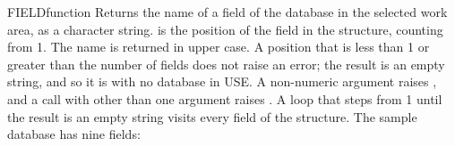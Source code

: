 \begin{XbaseEntry}{FIELD}{function}
Returns the name of a field of the database in the selected work area, as a character string.
\Syntax
{}
\Usage
{} is the position of the field in the structure, counting from 1. The name is returned in upper case. A position that is less than 1 or greater than the number of fields does not raise an error; the result is an empty string, and so it is with no database in USE. A non-numeric argument raises , and a call with other than one argument raises .
\Tips
A loop that steps  from 1 until the result is an empty string visits every field of the structure.
\Examples
The sample database has nine fields:
\end{XbaseEntry}

